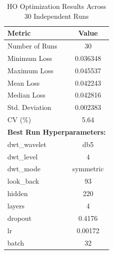 \begin{table}[htbp]
\centering
\caption{HO Optimization Results Across 30 Independent Runs}
\label{tab:ho_results}
\begin{tabular}{lc}
\hline
\textbf{Metric} & \textbf{Value} \\
\hline
Number of Runs & 30 \\
Minimum Loss   & 0.036348 \\
Maximum Loss   & 0.045537 \\
Mean Loss      & 0.042243 \\
Median Loss    & 0.042816 \\
Std. Deviation & 0.002383 \\
CV (\%)       & 5.64 \\
\hline
\multicolumn{2}{l}{\textbf{Best Run Hyperparameters:}} \\
dwt\_wavelet   & db5 \\
dwt\_level     & 4 \\
dwt\_mode      & symmetric \\
look\_back     & 93 \\
hidden         & 220 \\
layers         & 4 \\
dropout        & 0.4176 \\
lr             & 0.00172 \\
batch          & 32 \\
\hline
\end{tabular}
\end{table}
